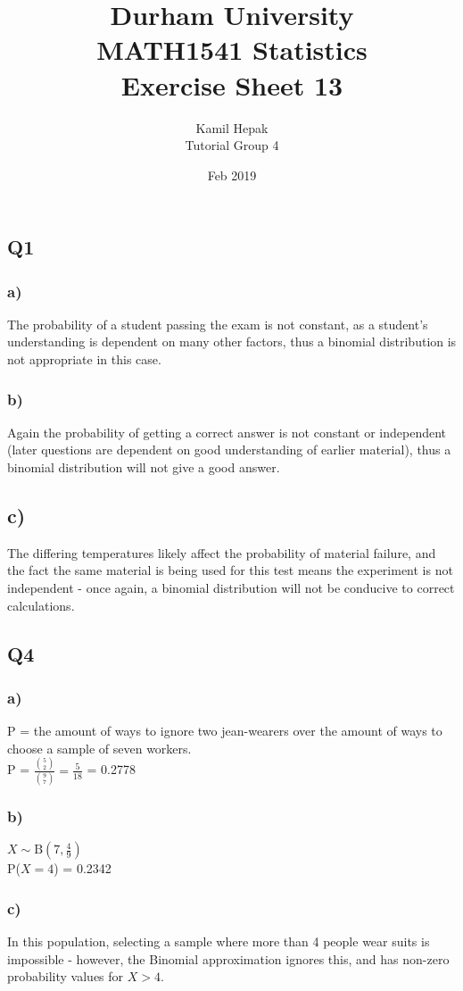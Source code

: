 \documentclass[]{article}
\title{\vspace{-5cm}Durham University\\
    MATH1541 Statistics \\
	Exercise Sheet 13}
\author{Kamil Hepak\\
        Tutorial Group 4}
\date{Feb 2019}
\begin{document}
\maketitle

\subsection{Q1}
\subsubsection{a)}
The probability of a student passing the exam is not constant, as a student's understanding is dependent on many other factors, thus a binomial distribution is not appropriate in this case.
\subsubsection{b)}
Again the probability of getting a correct answer is not constant or independent (later questions are dependent on good understanding of earlier material), thus a binomial distribution will not give a good answer.
\subsection{c)}
The differing temperatures likely affect the probability of material failure, and the fact the same material is being used for this test means the experiment is not independent - once again, a binomial distribution will not be conducive to correct calculations.

\subsection{Q4}
\subsubsection{a)}
P = the amount of ways to ignore two jean-wearers over the amount of ways to choose a sample of seven workers.
\\
P = $\frac{{5\choose 2}}{{9\choose 7}} = \frac{5}{18}$ = 0.2778
\subsubsection{b)}
$X \sim \textrm{B}(7,\frac{4}{9})$
\\
P($X=4$) = 0.2342
\subsubsection{c)}
In this population, selecting a sample where more than 4 people wear suits is impossible - however, the Binomial approximation ignores this, and has non-zero probability values for $X>4$.
\end{document}
